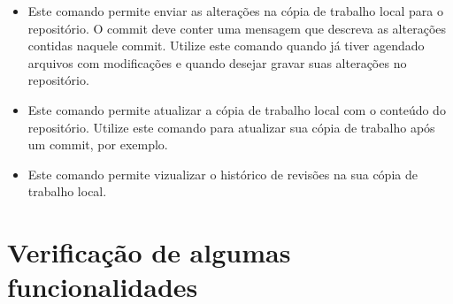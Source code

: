 \begin{itemize}
\item \colorbox{PineGreen}{
	\begin{minipage}{.57\linewidth}
	\end{minipage}
	}
    
    \subitem Este comando permite enviar as alterações na cópia de trabalho local para o repositório.
	     O commit deve conter uma mensagem que descreva as alterações contidas naquele commit.
	     Utilize este comando quando já tiver agendado arquivos com modificações e quando desejar
	     gravar suas alterações no repositório.

\item \colorbox{PineGreen}{
	\begin{minipage}{.18\linewidth}
	\end{minipage}
	}
    
    \subitem Este comando permite atualizar a cópia de trabalho local com o conteúdo do repositório.
	     Utilize este comando para atualizar sua cópia de trabalho após um commit, por exemplo.
      
\item \label{comando_log}
\colorbox{PineGreen}{
	\begin{minipage}{.13\linewidth}
	\end{minipage}
	}
    \subitem Este comando permite vizualizar o histórico de revisões na sua cópia de trabalho local.
    
\end{itemize}

% 
% 
% 
% 
% 
% 
% 

\section{Verificação de algumas funcionalidades}

